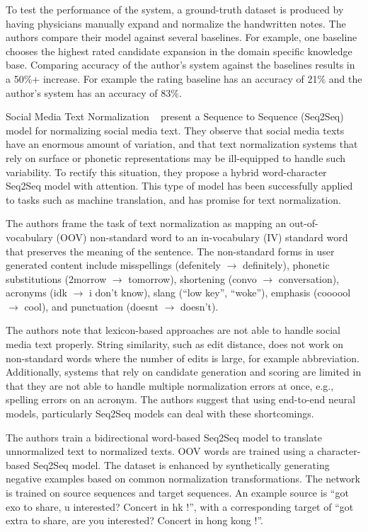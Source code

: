 \documentclass[11pt,a4paper]{article}
\begin{document}
To test the performance of the system, a ground-truth dataset is
produced by having physicians manually expand and normalize the
handwritten notes.  The authors compare their model against several
baselines.  For example, one baseline chooses the highest rated
candidate expansion in the domain specific knowledge base.  Comparing
accuracy of the author's system against the baselines results in a
50\%+ increase.  For example the rating baseline has an accuracy of 21\%
and the author's system has an accuracy of 83\%.

{Social Media Text Normalization}
~\cite{Lourentzo:2019} present a Sequence to Sequence (Seq2Seq) model
for normalizing social media text.  They observe that social media
texts have an enormous amount of variation, and that text
normalization systems that rely on surface or phonetic representations
may be ill-equipped to handle such variability.  To rectify this
situation, they propose a hybrid word-character Seq2Seq model with
attention.  This type of model has been successfully applied to tasks
such as machine translation, and has promise for text normalization.

The authors frame the task of text normalization as mapping an
out-of-vocabulary (OOV) non-standard word to an in-vocabulary (IV)
standard word that preserves the meaning of the sentence.  The
non-standard forms in user generated content include misspellings   
(defenitely $\rightarrow$ definitely), phonetic substitutions (2morrow $\rightarrow$
tomorrow), shortening (convo $\rightarrow$ conversation), acronyms (idk $\rightarrow$ i don’t
know), slang (``low key'', ``woke''), emphasis (coooool $\rightarrow$ cool), and
punctuation  
(doesnt $\rightarrow$ doesn't).

The authors note that lexicon-based approaches are not able to handle
social media text properly.  String similarity, such as edit distance,
does not work on non-standard words where the number of edits is
large, for example abbreviation.   Additionally, systems that rely on
candidate generation and scoring are limited in that they are not able
to handle multiple normalization errors at once, e.g., spelling errors
on an acronym.  The authors suggest that using end-to-end neural
models, particularly Seq2Seq models can deal with these shortcomings.

The authors train a bidirectional word-based Seq2Seq model to
translate unnormalized text to normalized texts.  OOV words are
trained using a character-based Seq2Seq model.  The dataset is
enhanced by synthetically generating negative examples based on common
normalization transformations.    The network is trained on source
sequences and target sequences.  An example source is ``got exo to
share, u interested?  Concert in hk !'', with a corresponding target of
``got extra to share, are you interested?  Concert in hong kong !''.
\end{document}
